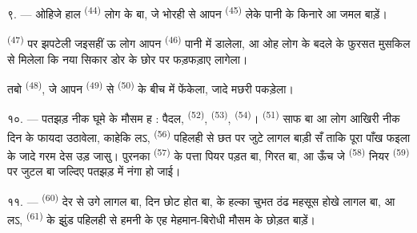 ९. --- ओहिजे हाल  \textsuperscript{(44)} लोग के बा, जे
भोरही से आपन  \textsuperscript{(45)} लेके पानी के किनारे आ
जमल बाड़ें।

 \textsuperscript{(47)}  पर झपटेली जइसहीं ऊ
लोग आपन  \textsuperscript{(46)} पानी में डालेला, आ ओह लोग के
 बदले के फुरसत मुसकिल से मिलेला कि नया सिकार डोर के छोर पर
फड़फड़ाए लागेला।

तबो  \textsuperscript{(48)}, जे आपन 
\textsuperscript{(49)} से  \textsuperscript{(50)} के बीच में
 फेंकेला, जादे मछरी पकड़ेला।

१०. --- पतझड़ नीक घूमे के मौसम ह : पैदल, 
\textsuperscript{(52)},  \textsuperscript{(53)},
 \textsuperscript{(54)}।  \textsuperscript{(51)}
साफ बा आ लोग आखिरी नीक दिन के फायदा उठावेला, काहेकि लऽ, 
\textsuperscript{(56)} पहिलही से छत पर जुटे लागल बाड़ी सँ ताकि पूरा पाँख
फइला के जादे गरम देस उड़ जासु। पुरनका 
\textsuperscript{(57)} के पत्ता पियर पड़त बा,  गिरत बा, आ
ऊँच  जे  \textsuperscript{(58)} नियर
 \textsuperscript{(59)} पर जुटल बा जल्दिए पतझड़ में नंगा हो जाई।

११. ---  \textsuperscript{(60)} देर से उगे लागल बा, दिन छोट
होत बा,  के हल्का चुभत ठंढ महसूस होखे लागल बा, आ लऽ,
 \textsuperscript{(61)} के झुंड पहिलही से हमनी के एह मेहमान-बिरोधी
मौसम के छोड़त बाड़ें।
